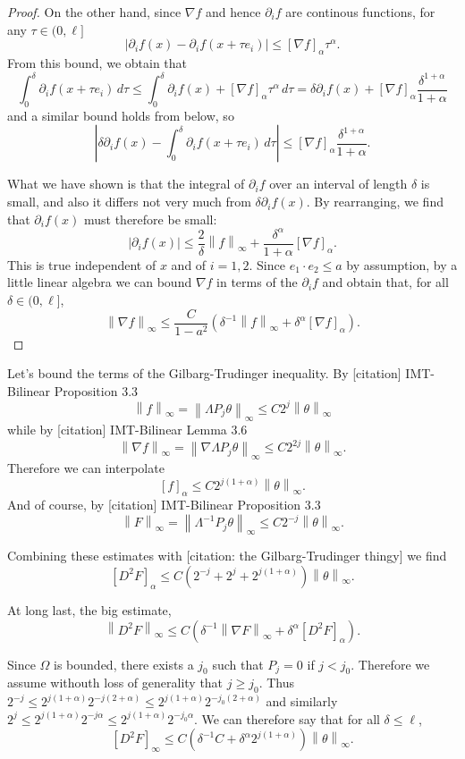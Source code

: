 \documentclass[11pt]{amsart}
\theoremstyle{remark}
\theoremstyle{definition}
\newcommand{\norm}[1]{\left\lVert#1\right\rVert}
\newcommand{\paren}[1]{\left( #1 \right)}
\newcommand{\bracket}[1]{\left[ #1 \right]}
\newcommand{\abs}[1]{\left\lvert #1 \right\rvert}
\newcommand{\del}{\partial}
\newcommand{\grad}{\nabla}
\newcommand{\n}{^{-1}}
\begin{document}
\begin{proof}
On the other hand, since $\grad f$ and hence $\del_i f$ are continous functions, for any $\tau \in (0,\ell]$
\[ \abs{\del_i f(x) - \del_i f(x+\tau e_i)} \leq \bracket{\grad f}_\alpha \tau^\alpha. \]
From this bound, we obtain that
\[ \int_0^\delta \del_i f(x + \tau e_i) \,d\tau \leq \int_0^\delta \del_i f(x) + \bracket{\grad f}_\alpha \tau^\alpha \,d\tau = \delta \del_i f(x) + \bracket{\grad f}_\alpha \frac{\delta^{1+\alpha}}{1+\alpha} \]
and a similar bound holds from below, so
\[ \abs{ \delta \del_i f(x) - \int_0^\delta \del_i f(x + \tau e_i) \,d\tau} \leq \bracket{\grad f}_\alpha \frac{\delta^{1+\alpha}}{1+\alpha}. \]

What we have shown is that the integral of $\del_i f$ over an interval of length $\delta$ is small, and also it differs not very much from $\delta \del_i f(x)$.  By rearranging, we find that $\del_i f(x)$ must therefore be small:
\[ \abs{\del_i f(x)} \leq \frac{2}{\delta} \norm{f}_\infty + \frac{\delta^\alpha}{1+\alpha} \bracket{\grad f}_\alpha. \]
This is true independent of $x$ and of $i=1,2$.  Since $e_1 \cdot e_2 \leq a$ by assumption, by a little linear algebra we can bound $\grad f$ in terms of the $\del_i f$ and obtain that, for all $\delta \in (0,\ell]$,
\[ \norm{\grad f}_\infty \leq \frac{C}{1-a^2} \paren{ \delta\n \norm{f}_\infty + \delta^\alpha \bracket{\grad f}_\alpha }. \]

\end{proof}

Let's bound the terms of the Gilbarg-Trudinger inequality.  By [citation] IMT-Bilinear Proposition 3.3
\[ \norm{f}_\infty = \norm{\Lambda P_j \theta}_\infty \leq C 2^j \norm{\theta}_\infty \]
while by [citation] IMT-Bilinear Lemma 3.6
\[ \norm{\grad f}_\infty = \norm{\grad \Lambda P_j \theta}_\infty \leq C 2^{2j} \norm{\theta}_\infty. \]
Therefore we can interpolate
\[ \bracket{f}_\alpha \leq C 2^{j(1+\alpha)} \norm{\theta}_\infty. \]
And of course, by [citation] IMT-Bilinear Proposition 3.3
\[ \norm{F}_\infty = \norm{\Lambda^{-1} P_j \theta}_\infty \leq C 2^{-j} \norm{\theta}_\infty. \]

Combining these estimates with [citation: the Gilbarg-Trudinger thingy] we find
\[ \bracket{D^2 F}_\alpha \leq C \paren{2^{-j} + 2^j + 2^{j(1+\alpha)}} \norm{\theta}_\infty. \]

At long last, the big estimate,
\[ \norm{D^2 F}_\infty \leq C \paren{\delta\n \norm{\grad F}_\infty + \delta^{\alpha} \bracket{D^2 F}_\alpha}. \]

Since $\Omega$ is bounded, there exists a $j_0$ such that $P_j = 0$ if $j < j_0$.  Therefore we assume withouth loss of generality that $j \geq j_0$.  Thus $2^{-j} \leq 2^{j(1+\alpha)} 2^{-j(2+\alpha)} \leq 2^{j(1+\alpha)} 2^{-j_0(2+\alpha)}$ and similarly $2^j \leq 2^{j(1+\alpha)}2^{-j\alpha} \leq 2^{j(1+\alpha)} 2^{-j_0\alpha}$.  We can therefore say that for all $\delta \leq \ell$,
\[ \bracket{D^2 F}_\infty \leq C \paren{\delta\n C + \delta^\alpha 2^{j(1+\alpha)}} \norm{\theta}_\infty. \]
\end{document}
